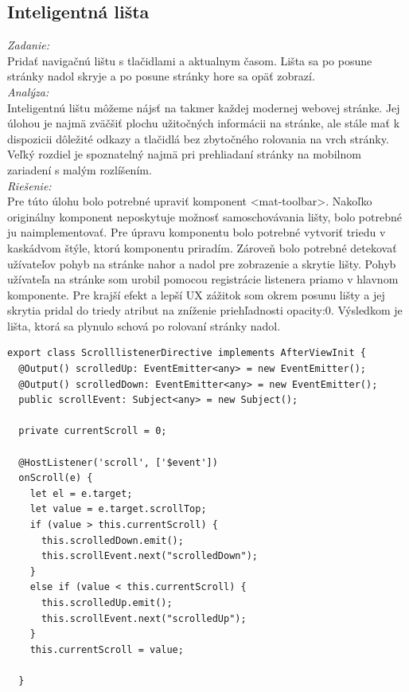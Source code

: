 \documentclass[11pt, oneside]{report}
\begin{document}
\subsection{Inteligentná lišta }
\textit{Zadanie:}\\
Pridať navigačnú lištu s tlačidlami a aktualnym časom. Lišta sa po posune stránky nadol skryje a po posune stránky hore sa opäť zobrazí.
\\\textit{Analýza:}\\
Inteligentnú lištu môžeme nájsť na takmer každej modernej webovej stránke. Jej úlohou je najmä zväčšiť plochu užitočných informácii na stránke, ale stále mať k dispozicii dôležité odkazy a tlačidlá  bez  zbytočného rolovania na vrch stránky. Veľký rozdiel je spoznatelný najmä pri prehliadaní stránky na mobilnom zariadení s malým rozlíšením. 
\\\textit{Riešenie:}\\
Pre túto úlohu bolo potrebné upraviť komponent \textsf{<mat-toolbar>}. Nakoľko originálny komponent neposkytuje možnosť samoschovávania lišty, bolo potrebné ju naimplementovať. Pre úpravu komponentu bolo potrebné vytvoriť triedu v kaskádvom štýle, ktorú komponentu priradím. Zároveň bolo potrebné detekovať užívateľov pohyb na stránke nahor a nadol pre zobrazenie a skrytie lišty. Pohyb  užívateľa na stránke som urobil pomocou registrácie listenera priamo v hlavnom komponente.  Pre krajší efekt a lepší UX  zážitok  som okrem posunu lišty a jej skrytia pridal do triedy  atribut na zníženie priehľadnosti \textsf{opacity:0}. Výsledkom je  lišta, ktorá sa plynulo schová po rolovaní stránky nadol. 
\lstset{language=JavaScript}
\begin{lstlisting}[showstringspaces=false, caption= Event na odchytávanie rolovania stránky,captionpos=b]
export class ScrolllistenerDirective implements AfterViewInit {
  @Output() scrolledUp: EventEmitter<any> = new EventEmitter();
  @Output() scrolledDown: EventEmitter<any> = new EventEmitter();
  public scrollEvent: Subject<any> = new Subject();

  private currentScroll = 0;

  @HostListener('scroll', ['$event'])
  onScroll(e) {
    let el = e.target;
    let value = e.target.scrollTop;
    if (value > this.currentScroll) {
      this.scrolledDown.emit();
      this.scrollEvent.next("scrolledDown");
    }
    else if (value < this.currentScroll) {
      this.scrolledUp.emit();
      this.scrollEvent.next("scrolledUp");
    }
    this.currentScroll = value;

  }
\end{lstlisting}
\end{document}
